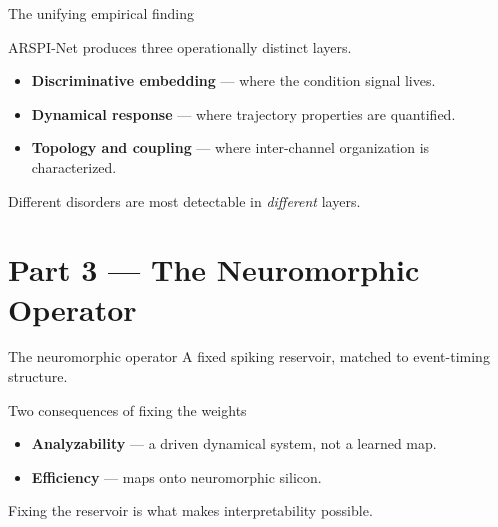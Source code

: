 \documentclass[11pt,aspectratio=169]{beamer}
\begin{document}
\begin{frame}{The unifying empirical finding}
  \vspace{0.6em}
  \begin{center}\large
    ARSPI-Net produces \alert{three operationally distinct layers}.
  \end{center}
  \vspace{0.4em}
  \begin{itemize}
    \item \textbf{Discriminative embedding} --- where the condition signal lives.
    \item \textbf{Dynamical response} --- where trajectory properties are quantified.
    \item \textbf{Topology and coupling} --- where inter-channel organization is characterized.
  \end{itemize}
  \vspace{0.8em}
  \begin{center}\color{sbaccent}
    Different disorders are most detectable in \emph{different} layers.
  \end{center}
\end{frame}

\section{Part 3 --- The Neuromorphic Operator}

\begin{frame}{The neuromorphic operator}
  \vspace{0.6em}
  A fixed spiking reservoir, matched to event-timing structure.
  \vspace{0.8em}
  \begin{block}{Two consequences of fixing the weights}
    \begin{itemize}
      \item \textbf{Analyzability} --- a driven dynamical system, not a learned map.
      \item \textbf{Efficiency} --- maps onto neuromorphic silicon.
    \end{itemize}
  \end{block}
  \vspace{0.4em}
  \begin{center}\color{sbnavy}
    Fixing the reservoir is what makes interpretability possible.
  \end{center}
\end{frame}
\end{document}
